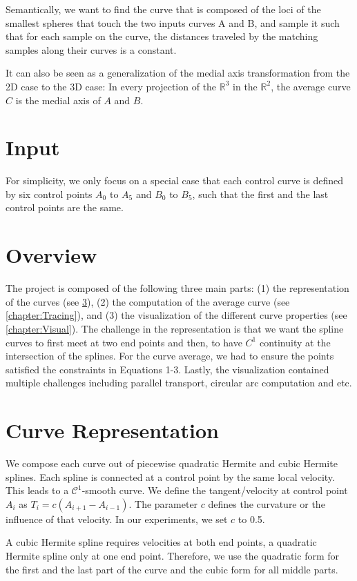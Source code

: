 \documentclass[journal, letterpaper]{IEEEtran}
\begin{document}
Semantically, we want to find the curve that is composed of the loci of the smallest spheres that touch the two inputs curves A and B,
and sample it such that for each sample on the curve, the distances traveled by the matching samples along their curves is a constant.

It can also be seen as a generalization of the medial axis transformation from the 2D case to the 3D case: 
In every projection of the $\mathbb{R}^3$ in the $\mathbb{R}^2$, the average curve $C$ is the medial axis of $A$ and $B$.

\section{Input}
For simplicity, we only focus on a special case that each control curve is defined by six control points $A_0$ to $A_5$ and $B_0$ to $B_5$, such that the first and the last control points are the same.

\section{Overview}
The project is composed of the following three main parts: (1) the representation of the curves (see \ref{chapter:CurveRepr}),
(2) the computation of the average curve (see \ref{chapter:Tracing}), and (3) the visualization of the different curve properties (see \ref{chapter:Visual}).
The challenge in the representation is that we want the spline curves to first meet at two end points and then,
to have $C^1$ continuity at the intersection of the splines. For the curve average, we had to ensure
the points satisfied the constraints in Equations 1-3. Lastly, the visualization contained multiple challenges
including parallel transport, circular arc computation and etc.

\section{Curve Representation}\label{chapter:CurveRepr}
We compose each curve out of piecewise quadratic Hermite and cubic Hermite splines. Each spline is connected at a control point by the same local velocity. This leads to a $\mathcal{C}^1$-smooth curve.
We define the tangent/velocity at control point $A_i$ as $T_i = c(A_{i+1}-A_{i-1})$. The parameter $c$ defines the curvature or the influence of that velocity. In our experiments, we set $c$ to 0.5.

A cubic Hermite spline requires velocities at both end points, a quadratic Hermite spline only at one end point. Therefore, we use the quadratic form for the first and the last part of the curve and the cubic form for all middle parts.
\end{document}
